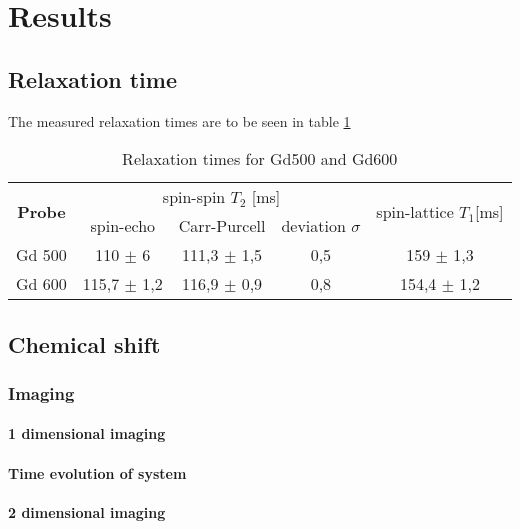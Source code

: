 \section{Results}
\subsection{Relaxation time}
The measured relaxation times are to be seen in table \ref{tab: relaxation times}
\begin{table}[!htbp]
 \begin{center}
  \caption{Relaxation times for Gd500 and Gd600}
  \label{tab: relaxation times}
  \begin{tabular}{|c||c|c|c|c|}
	\hline
	\multirow{2}{*}{\textbf{Probe}} & \multicolumn{3}{c}{spin-spin $T_2$ [ms]} &\multirow{2}{*}{ spin-lattice $T_1$[ms]}\\
	& spin-echo & Carr-Purcell & deviation $\sigma$\\
	\hline
	\hline	
	Gd 500 & 110 $\pm$ 6 & 111,3 $\pm$ 1,5 & 0,5 & 159 $\pm$ 1,3 \\
	Gd 600 & 115,7 $\pm$ 1,2 & 116,9 $\pm$ 0,9 & 0,8 & 154,4 $\pm$ 1,2 \\
	\hline
  \end{tabular}
 \end{center}
\end{table}




\subsection{Chemical shift}

\subsubsection{Imaging}
\paragraph{1 dimensional imaging}
\paragraph{Time evolution of system}
\paragraph{2 dimensional imaging}